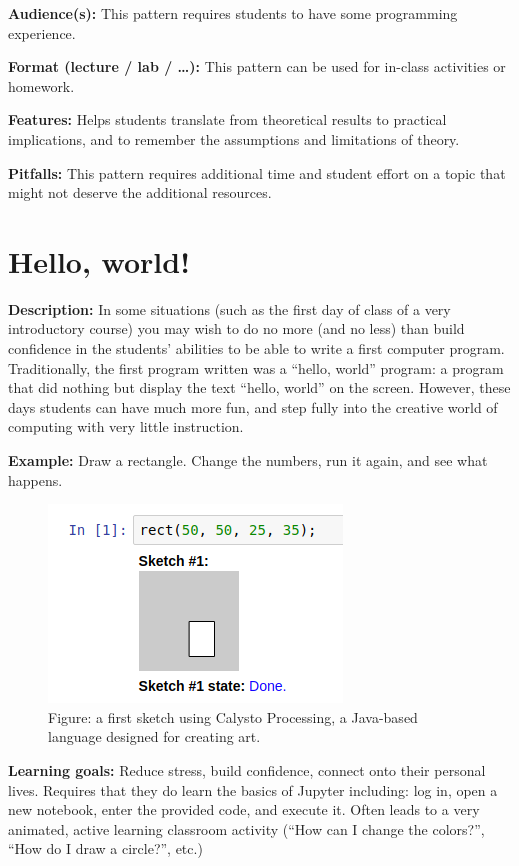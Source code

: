 \documentclass[]{book}
\begin{document}
\textbf{Audience(s):} This pattern requires students to have some
programming experience.

\textbf{Format (lecture / lab / \ldots{}):} This pattern can be used for
in-class activities or homework.

\textbf{Features:} Helps students translate from theoretical results to
practical implications, and to remember the assumptions and limitations
of theory.

\textbf{Pitfalls:} This pattern requires additional time and student
effort on a topic that might not deserve the additional resources.

\section{Hello, world!}\label{hello-world}

\textbf{Description:} In some situations (such as the first day of class
of a very introductory course) you may wish to do no more (and no less)
than build confidence in the students' abilities to be able to write a
first computer program. Traditionally, the first program written was a
``hello, world'' program: a program that did nothing but display the
text ``hello, world'' on the screen. However, these days students can
have much more fun, and step fully into the creative world of computing
with very little instruction.

\textbf{Example:} Draw a rectangle. Change the numbers, run it again,
and see what happens.

\begin{figure}
\centering
\includegraphics{images/processing.png}
\caption{Figure: a first sketch using Calysto Processing, a Java-based
language designed for creating art.}
\end{figure}

\textbf{Learning goals:} Reduce stress, build confidence, connect onto
their personal lives. Requires that they do learn the basics of Jupyter
including: log in, open a new notebook, enter the provided code, and
execute it. Often leads to a very animated, active learning classroom
activity (``How can I change the colors?'', ``How do I draw a circle?'',
etc.)
\end{document}
